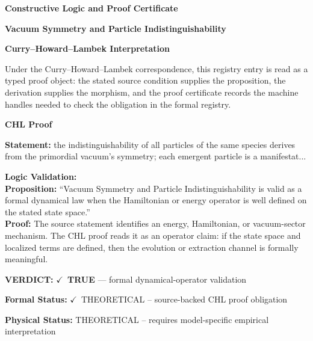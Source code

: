 \clearpage
\begingroup\tzpsupportsetup
\noindent\textbf{\fontsize{10.8pt}{12.8pt}\selectfont [ID 0196] Constructive Logic and Proof Certificate}\par
\noindent\textbf{\fontsize{10pt}{12pt}\selectfont Vacuum Symmetry and Particle Indistinguishability}\par
\vspace{0.45em}
\begingroup
\footnotesize
\setlength{\parskip}{0.22em}
\setlength{\parindent}{0pt}
\noindent\textbf{Curry--Howard--Lambek Interpretation}\par
Under the Curry--Howard--Lambek correspondence, this registry entry is read as a typed proof
object: the stated source condition supplies the proposition, the derivation supplies the
morphism, and the proof certificate records the machine handles needed to check the obligation
in the formal registry.

\vspace{0.45em}
\noindent\textbf{CHL Proof}\par
\textbf{Statement:} the indistinguishability of all particles of the same species derives from the
primordial vacuum's symmetry; each emergent particle is a manifestat...

\textbf{Logic Validation:}\\
\textbf{Proposition:} ``Vacuum Symmetry and Particle Indistinguishability is valid as a formal dynamical law
when the Hamiltonian or energy operator is well defined on the stated state space.''\\
\textbf{Proof:} The source statement identifies an energy, Hamiltonian, or vacuum-sector mechanism. The
CHL proof reads it as an operator claim: if the state space and localized terms are
defined, then the evolution or extraction channel is formally meaningful.

\textbf{VERDICT:} \ensuremath{\checkmark}\ \textbf{TRUE} --- formal dynamical-operator validation

\textbf{Formal Status:} \ensuremath{\checkmark}\ THEORETICAL -- source-backed CHL proof obligation

\textbf{Physical Status:} THEORETICAL -- requires model-specific empirical interpretation
\par\vspace{0.45em}
\par
\ifTZPDarkEdition
{}
\fi
\endgroup
\endgroup
